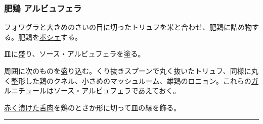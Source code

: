 \begin{recette}
\hypertarget{poularde-albufera}{%
\subsubsection{肥鶏 アルビュフェラ}\label{poularde-albufera}}



フォワグラと大きめのさいの目に切ったトリュフを米と合わせ、肥鶏に詰め物する。肥鶏を\protect\hyperlink{les-poches}{ポシェ}する。

皿に盛り、ソース・アルビュフェラを塗る。

周囲に次のものを盛り込む。くり抜きスプーンで丸く抜いたトリュフ、同様に丸く整形した鶏のクネル、小さめのマッシュルーム、雄鶏のロニョン。これらの\protect\hyperlink{garniture-albufera}{ガルニチュール}は\protect\hyperlink{sauce-albufera}{ソース・アルビュフェラ}であえておく。

\protect\hyperlink{saumure-liquide-pour-langues}{赤く漬けた舌肉}を鶏のとさか形に切って皿の縁を飾る。
\end{recette}
\begin{center}\rule{0.5\linewidth}{\linethickness}\end{center}

